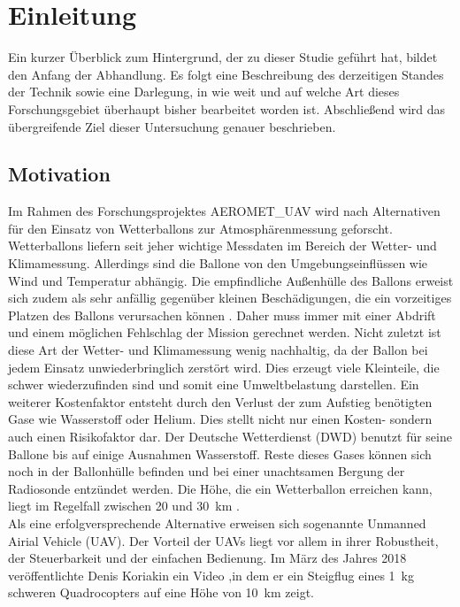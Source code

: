 \chapter{Einleitung}
\label{chap:Einleitung}
Ein kurzer Überblick zum Hintergrund, der zu  dieser Studie geführt hat, bildet den Anfang der Abhandlung.  Es folgt eine Beschreibung des derzeitigen Standes der Technik sowie eine Darlegung, in wie weit und auf welche Art dieses Forschungsgebiet überhaupt bisher bearbeitet worden ist. Abschließend  wird das übergreifende Ziel dieser Untersuchung genauer beschrieben.


\section{Motivation}
\label{sec:motivation}
Im Rahmen des Forschungsprojektes AEROMET\_UAV wird nach Alternativen für den Einsatz von Wetterballons zur Atmosphärenmessung geforscht. Wetterballons liefern seit jeher wichtige Messdaten im Bereich der Wetter- und Klimamessung. Allerdings sind die Ballone von den Umgebungseinflüssen wie Wind und Temperatur abhängig. Die empfindliche Außenhülle des Ballons erweist sich zudem als sehr anfällig gegenüber kleinen Beschädigungen, die ein vorzeitiges Platzen des Ballons verursachen können \cite{dwd}. Daher muss immer mit einer Abdrift und einem möglichen Fehlschlag der Mission gerechnet werden. Nicht zuletzt ist diese Art der Wetter- und Klimamessung wenig nachhaltig, da der Ballon bei jedem Einsatz unwiederbringlich zerstört wird. Dies erzeugt viele Kleinteile, die schwer wiederzufinden sind und somit eine Umweltbelastung darstellen. Ein weiterer Kostenfaktor entsteht durch den Verlust der zum Aufstieg benötigten Gase wie Wasserstoff oder Helium. Dies stellt nicht nur einen Kosten- sondern auch einen Risikofaktor dar. Der Deutsche Wetterdienst (DWD) benutzt für seine Ballone bis auf einige Ausnahmen Wasserstoff. Reste dieses Gases können sich noch in der Ballonhülle befinden und bei einer unachtsamen Bergung der Radiosonde entzündet werden.
Die Höhe, die ein Wetterballon erreichen kann, liegt im Regelfall zwischen \SI{20}{} und \SI{30}{km} \cite{dwd}. \\ 
Als eine erfolgversprechende Alternative erweisen sich sogenannte Unmanned Airial Vehicle (UAV). Der Vorteil der UAVs liegt vor allem in ihrer Robustheit, der Steuerbarkeit und der einfachen Bedienung. Im März des Jahres 2018 veröffentlichte Denis Koriakin ein Video \cite{Anderson.2018},in dem er ein Steigflug eines \SI{1}{kg} schweren Quadrocopters auf eine Höhe von \SI{10}{km} zeigt. 


